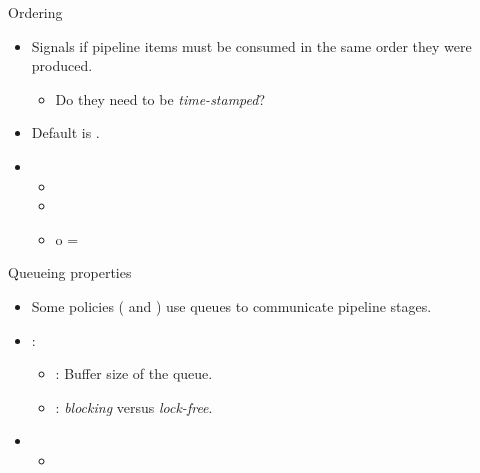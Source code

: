 \begin{frame}[t]{Ordering}
\begin{itemize}
  \item Signals if pipeline items must be consumed in the same order they were produced.
    \begin{itemize}
      \item Do they need to be \emph{time-stamped}?
    \end{itemize}

  \vfill
  \item Default is .

  \vfill
  \item {}
    \begin{itemize}
      \item {}
      \item {}
      \item {} o = 
    \end{itemize}
\end{itemize}
\end{frame}

\begin{frame}{Queueing properties}
\begin{itemize}
  \item Some policies ( and ) use queues to
        communicate pipeline stages.

  \vfill
  \item {}:
    \begin{itemize}
      \item {}: Buffer size of the queue.
      \item {}: \emph{blocking} versus \emph{lock-free}.
    \end{itemize}

  \vfill
  \item {}
    \begin{itemize}
      \item {}
    \end{itemize}
\end{itemize}
\end{frame}
